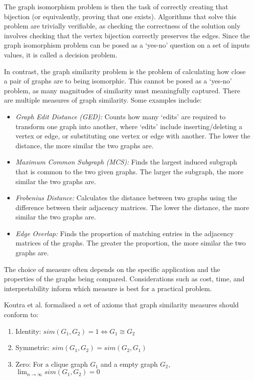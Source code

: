 The graph isomorphism problem is then the task of correctly creating that bijection (or equivalently, proving that one exists). Algorithms that solve this problem are trivially verifiable, as checking the correctness of the solution only involves checking that the vertex bijection correctly preserves the edges. Since the graph isomorphism problem can be posed as a `yes-no' question on a set of inputs values, it is called a decision problem.

In contrast, the graph similarity problem is the problem of calculating how close a pair of graphs are to being isomorphic. This cannot be posed as a `yes-no' problem, as many magnitudes of similarity must meaningfully captured. There are multiple measures of graph similarity. Some examples include:

\begin{itemize}
    \item \textit{Graph Edit Distance (GED):} Counts how many `edits' are required to transform one graph into another, where `edits' include inserting/deleting a vertex or edge, or substituting one vertex or edge with another. The lower the distance, the more similar the two graphs are.
    \item \textit{Maximum Common Subgraph (MCS):} Finds the largest induced subgraph that is common to the two given graphs. The larger the subgraph, the more similar the two graphs are.
    \item \textit{Frobenius Distance:} Calculates the distance between two graphs using the difference between their adjacency matrices. The lower the distance, the more similar the two graphs are.
    \item \textit{Edge Overlap:} Finds the proportion of matching entries in the adjacency matrices of the graphs. The greater the proportion, the more similar the two graphs are.\cite{QAOA_graph_sim}
\end{itemize}

The choice of measure often depends on the specific application and the properties of the graphs being compared. Considerations such as cost, time, and interpretability inform which measure is best for a practical problem.

Koutra et al. \cite{deltacon} formalised a set of axioms that graph similarity measures should conform to: 
\begin{enumerate}
    \item Identity: $sim(G_{1},G_{2})=1 \iff G_{1} \cong G_{2}$ \label{axiom:1}
    \item Symmetric:  $sim(G_{1},G_{2})=sim(G_{2},G_{1})$ \label{axiom:2}
    \item Zero: For a clique graph $G_{1}$ and a empty graph $G_{2}$, 
    $\lim_{n \to \infty} sim(G_{1},G_{2}) = 0$ \label{axiom:3}
\end{enumerate}

